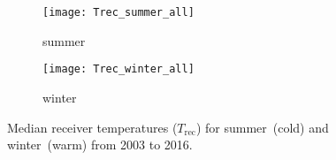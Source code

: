 \begin{figure}[ht]
    \centering
    \begin{subfigure}[b]{0.9545\textwidth}
        \texttt{[image: Trec\_summer\_all]}
        \caption{summer}\label{fig:01:trec:summer}
    \end{subfigure}
    \begin{subfigure}[b]{0.9545\textwidth}
        \texttt{[image: Trec\_winter\_all]}
        \caption{winter}\label{fig:01:trec:winter}
    \end{subfigure}
    \caption{Median receiver temperatures ($T_\mathrm{rec}$) for
        summer~(cold) and winter~(warm) from 2003 to 2016.
        }\label{fig:trec}
\end{figure}
